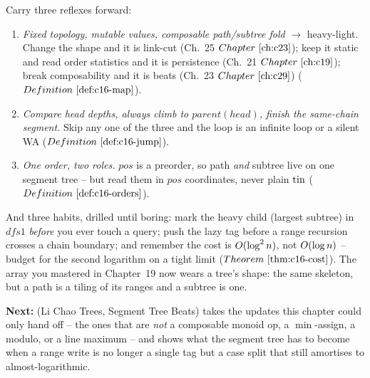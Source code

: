\begin{lastword}
\medskip
Carry three reflexes forward:
\begin{enumerate}[nosep, leftmargin=1.6em]
  \item \emph{Fixed topology, mutable values, composable path/subtree fold} \(\to\) heavy-light.
        Change the shape and it is link-cut (Ch.~25 \(\chref{c23}\)); keep it static and read order
        statistics and it is persistence (Ch.~21 \(\chref{c19}\)); break composability and it is
        beats (Ch.~23 \(\chref{c29}\)) (\(\defref{c16-map}\)).
  \item \emph{Compare head depths, always climb to \(\mathit{parent}(\mathit{head})\), finish the
        same-chain segment.} Skip any one of the three and the loop is an infinite loop or a silent
        WA (\(\defref{c16-jump}\)).
  \item \emph{One order, two roles.} \(\mathit{pos}\) is a preorder, so path \emph{and} subtree live
        on one segment tree -- but read them in \(\mathit{pos}\) coordinates, never plain \(\operatorname{tin}\)
        (\(\defref{c16-orders}\)).
\end{enumerate}

\medskip
And three habits, drilled until boring: mark the heavy child (largest subtree) in \(\mathit{dfs1}\)
\emph{before} you ever touch a query; push the lazy tag before a range recursion crosses a chain
boundary; and remember the cost is \(O(\log^2 n)\), not \(O(\log n)\) -- budget for the
second logarithm on a tight limit (\(\thmref{c16-cost}\)). The array you mastered in Chapter~19 now
wears a tree's shape: the same skeleton, but a path is a tiling of its ranges and a subtree is one.

\medskip
\textbf{Next:}  (Li Chao Trees, Segment Tree Beats) takes the updates this chapter could
only hand off -- the ones that are \emph{not} a composable monoid op, a \(\min\)-assign, a modulo, or
a line maximum -- and shows what the segment tree has to become when a range write is no longer a
single tag but a case split that still amortises to almost-logarithmic.
\end{lastword}
